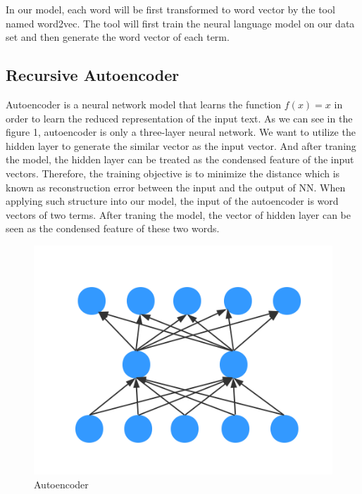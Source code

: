 \documentclass[dvips,12pt]{article}
\begin{document}
In our model, each word will be first transformed to word vector by the tool named word2vec\cite{mikolov2013efficient}. The tool will first train the neural language model on our data set and then generate the word vector of each term.

\subsection{Recursive Autoencoder}
Autoencoder is a neural network model that learns the function $f(x)=x$ in order to learn the reduced representation of the input text. As we can see in the figure 1, autoencoder is only a three-layer neural network. We want to utilize the hidden layer to generate the similar vector as the input vector. And after traning the model, the hidden layer can be treated as the condensed feature of the input vectors. Therefore, the training objective is to minimize the distance which is known as reconstruction error between the input and the output of NN. When applying such structure into our model, the input of the autoencoder is word vectors of two terms. After traning the model, the vector of hidden layer can be seen as the condensed feature of these two words.

\begin{figure}[ht]
\centering
\includegraphics[width = 0.8\linewidth]{figure/autoencoder}
\caption{Autoencoder}
\label{fig:ae}
\end{figure}
\end{document}
